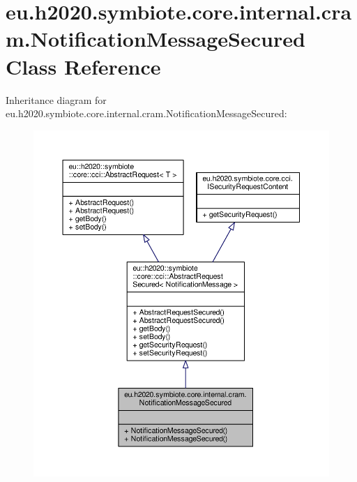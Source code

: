 \hypertarget{classeu_1_1h2020_1_1symbiote_1_1core_1_1internal_1_1cram_1_1NotificationMessageSecured}{}\section{eu.\+h2020.\+symbiote.\+core.\+internal.\+cram.\+Notification\+Message\+Secured Class Reference}
\label{classeu_1_1h2020_1_1symbiote_1_1core_1_1internal_1_1cram_1_1NotificationMessageSecured}


Inheritance diagram for eu.\+h2020.\+symbiote.\+core.\+internal.\+cram.\+Notification\+Message\+Secured\+:\nopagebreak
\begin{figure}[H]
\begin{center}
\leavevmode
\includegraphics[width=350pt]{classeu_1_1h2020_1_1symbiote_1_1core_1_1internal_1_1cram_1_1NotificationMessageSecured__inherit__graph}
\end{center}
\end{figure}


